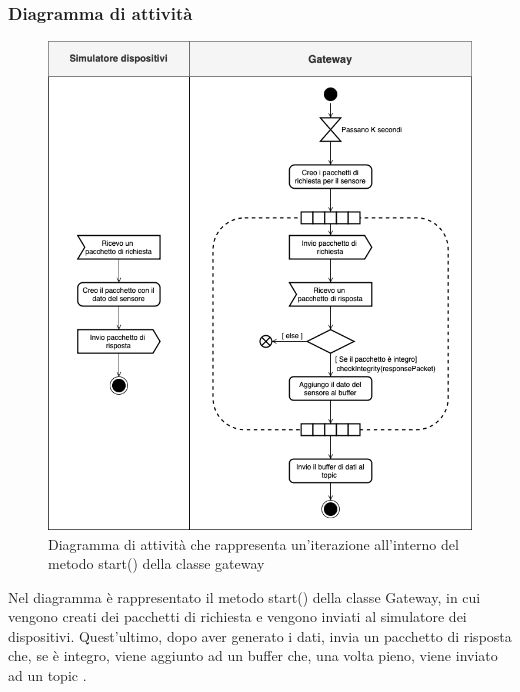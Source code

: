 	\subsubsection{Diagramma di attività}%
		\begin{figure}[H]
			\centering
			\includegraphics[scale=0.500]{res/images/GATEWAY/gateway.start().png}
			\caption{Diagramma di attività che rappresenta un'iterazione all'interno del metodo start() della classe gateway}
			\label{Diagramma 4}
		\end{figure}
		 Nel diagramma è rappresentato il metodo start() della classe Gateway, in cui vengono creati dei pacchetti di richiesta e vengono inviati al simulatore dei dispositivi.
		 \newline
		 Quest'ultimo, dopo aver generato i dati, invia un pacchetto di risposta che, se è integro, viene aggiunto ad un buffer che, una volta pieno, viene inviato ad un topic .   
		